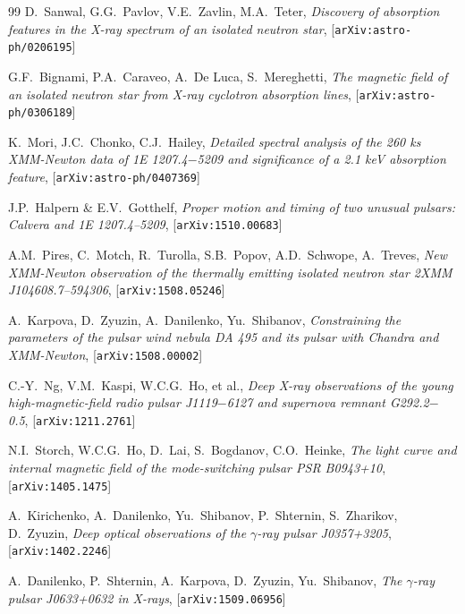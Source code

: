 \documentclass{pos1}
\begin{document}
\begin{thebibliography}{99}
D.~Sanwal, G.G.~Pavlov, V.E.~Zavlin, M.A.~Teter,
\textit{Discovery of absorption features in the X-ray spectrum of an isolated neutron star},
[\texttt{arXiv:astro-ph/0206195}]

G.F.~Bignami, P.A.~Caraveo, A.~De Luca, S.~Mereghetti,
\textit{The magnetic field of an isolated neutron star from X-ray cyclotron absorption lines},
[\texttt{arXiv:astro-ph/0306189}]

K.~Mori, J.C.~Chonko, C.J.~Hailey,
\textit{Detailed spectral analysis of the 260 ks XMM-Newton data of 1E 1207.4$-$5209 and significance of a 2.1 keV absorption feature},
[\texttt{arXiv:astro-ph/0407369}]

J.P.~Halpern \& E.V.~Gotthelf,
\textit{Proper motion and timing of two unusual pulsars: Calvera and 1E 1207.4--5209},
[\texttt{arXiv:1510.00683}]

A.M.~Pires, C.~Motch, R.~Turolla, S.B.~Popov, A.D.~Schwope, A.~Treves,
\textit{New XMM-Newton observation of the thermally emitting isolated neutron star 2XMM J104608.7--594306},
[\texttt{arXiv:1508.05246}]

A.~Karpova, D.~Zyuzin, A.~Danilenko, Yu.~Shibanov,
\textit{Constraining the parameters of the pulsar wind nebula DA 495 and its pulsar with Chandra and XMM-Newton},
[\texttt{arXiv:1508.00002}]

C.-Y.~Ng, V.M.~Kaspi, W.C.G.~Ho, et al.,
\textit{Deep X-ray observations of the young high-magnetic-field radio pulsar J1119$-$6127 and supernova remnant G292.2$-$0.5},
[\texttt{arXiv:1211.2761}]

N.I.~Storch, W.C.G.~Ho, D.~Lai, S.~Bogdanov, C.O.~Heinke,
\textit{The light curve and internal magnetic field of the mode-switching pulsar PSR B0943+10},
[\texttt{arXiv:1405.1475}]

A.~Kirichenko, A.~Danilenko, Yu.~Shibanov, P.~Shternin, S.~Zharikov, D.~Zyuzin,
\textit{Deep optical observations of the $\gamma$-ray pulsar J0357+3205},
[\texttt{arXiv:1402.2246}]

A.~Danilenko, P.~Shternin, A.~Karpova, D.~Zyuzin, Yu.~Shibanov,
\textit{The $\gamma$-ray pulsar J0633+0632 in X-rays},
[\texttt{arXiv:1509.06956}]

\end{thebibliography}
\end{document}
